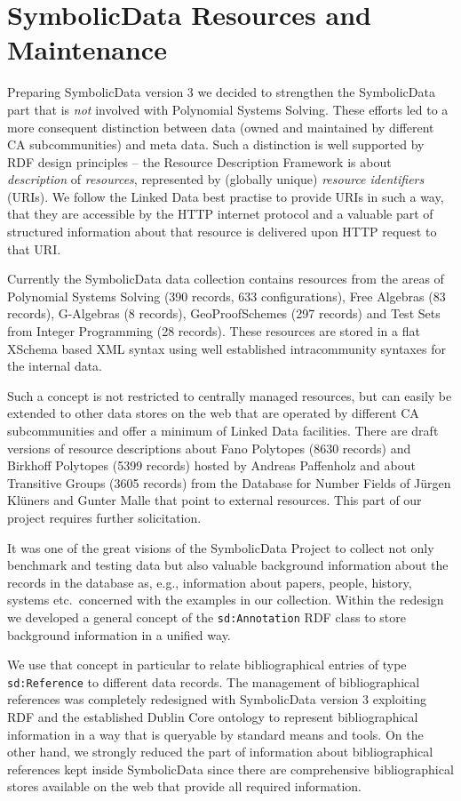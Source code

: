 \documentclass{llncs}
\newcommand{\SD}{{\sc SymbolicData}}
\begin{document}
\section{{\SD} Resources and Maintenance}

Preparing {\SD} version 3 we decided to strengthen the {\SD} part that is
\emph{not} involved with Polynomial Systems Solving.  These efforts led to a
more consequent distinction between data (owned and maintained by different CA
subcommunities) and meta data. Such a distinction is well supported by RDF
design principles -- the Resource Description Framework is about
\emph{description} of \emph{resources}, represented by (globally unique)
\emph{resource identifiers} (URIs). We follow the Linked Data best practise to
provide URIs in such a way, that they are accessible by the HTTP internet
protocol and a valuable part of structured information about that resource is
delivered upon HTTP request to that URI.

Currently the {\SD} data collection contains resources from the areas of
Polynomial Systems Solving (390 records, 633 configurations), Free Algebras
(83 records), G-Algebras (8 records), GeoProofSchemes (297 records) and Test
Sets from Integer Programming (28 records). These resources are stored in a
flat XSchema based XML syntax using well established intracommunity syntaxes
for the internal data.

Such a concept is not restricted to centrally managed resources, but can
easily be extended to other data stores on the web that are operated by
different CA subcommunities and offer a minimum of Linked Data facilities.
There are draft versions of resource descriptions about Fano Polytopes (8630
records) and Birkhoff Polytopes (5399 records) hosted by Andreas Paffenholz
and about Transitive Groups (3605 records) from the Database for Number Fields
of J\"urgen Kl\"uners and Gunter Malle that point to external resources.  This
part of our project requires further solicitation.

It was one of the great visions of the {\SD} Project to collect not only
benchmark and testing data but also valuable background information about the
records in the database as, e.g., information about papers, people, history,
systems etc.\ concerned with the examples in our collection.  Within the
redesign we developed a general concept of the \texttt{sd:Annotation} RDF
class to store background information in a unified way. 

We use that concept in particular to relate bibliographical entries of type
\texttt{sd:Reference} to different data records.  The management of
bibliographical references was completely redesigned with {\SD} version 3
exploiting RDF and the established Dublin Core ontology \cite{dcterms} to
represent bibliographical information in a way that is queryable by standard
means and tools. On the other hand, we strongly reduced the part of
information about bibliographical references kept inside {\SD} since there are
comprehensive bibliographical stores available on the web that provide all
required information.  
\end{document}
